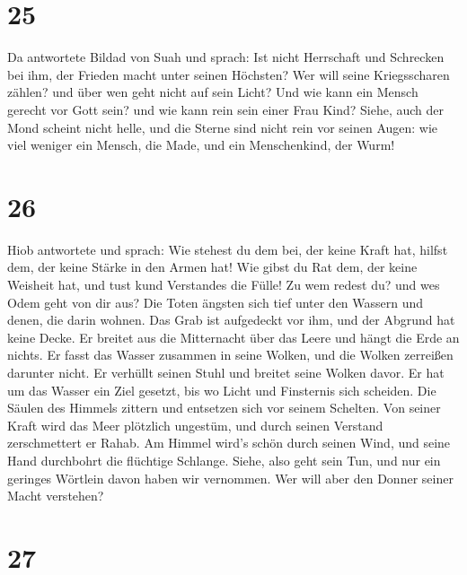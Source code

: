 \hypertarget{section-24}{%
\section{25}\label{section-24}}

 Da antwortete Bildad von Suah und sprach: 
Ist nicht Herrschaft und Schrecken bei ihm, der Frieden macht unter
seinen Höchsten?  Wer will seine Kriegsscharen zählen? und
über wen geht nicht auf sein Licht?  Und wie kann ein
Mensch gerecht vor Gott sein? und wie kann rein sein einer Frau Kind?
 Siehe, auch der Mond scheint nicht helle, und die Sterne
sind nicht rein vor seinen Augen:  wie viel weniger ein
Mensch, die Made, und ein Menschenkind, der Wurm!

\hypertarget{section-25}{%
\section{26}\label{section-25}}

 Hiob antwortete und sprach:  Wie stehest du
dem bei, der keine Kraft hat, hilfst dem, der keine Stärke in den Armen
hat!  Wie gibst du Rat dem, der keine Weisheit hat, und
tust kund Verstandes die Fülle!  Zu wem redest du? und wes
Odem geht von dir aus?  Die Toten ängsten sich tief unter
den Wassern und denen, die darin wohnen.  Das Grab ist
aufgedeckt vor ihm, und der Abgrund hat keine Decke.  Er
breitet aus die Mitternacht über das Leere und hängt die Erde an nichts.
 Er fasst das Wasser zusammen in seine Wolken, und die
Wolken zerreißen darunter nicht.  Er verhüllt seinen Stuhl
und breitet seine Wolken davor.  Er hat um das Wasser ein
Ziel gesetzt, bis wo Licht und Finsternis sich scheiden. 
Die Säulen des Himmels zittern und entsetzen sich vor seinem Schelten.
 Von seiner Kraft wird das Meer plötzlich ungestüm, und
durch seinen Verstand zerschmettert er Rahab.  Am Himmel
wird's schön durch seinen Wind, und seine Hand durchbohrt die flüchtige
Schlange.  Siehe, also geht sein Tun, und nur ein
geringes Wörtlein davon haben wir vernommen. Wer will aber den Donner
seiner Macht verstehen?

\hypertarget{section-26}{%
\section{27}\label{section-26}}

